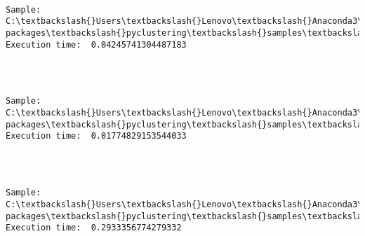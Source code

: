 \documentclass[11pt]{article}
\begin{document}
    \begin{center}
    \end{center}
    { \hspace*{\fill} \\}
    
    \begin{Verbatim}[commandchars=\\\{\}]
Sample:  C:\textbackslash{}Users\textbackslash{}Lenovo\textbackslash{}Anaconda3\textbackslash{}lib\textbackslash{}site-packages\textbackslash{}pyclustering\textbackslash{}samples\textbackslash{}samples\textbackslash{}fcps\textbackslash{}Tetra.data 		Execution time:  0.04245741304487183 


    \end{Verbatim}

    \begin{center}
    \end{center}
    { \hspace*{\fill} \\}
    
    \begin{Verbatim}[commandchars=\\\{\}]
Sample:  C:\textbackslash{}Users\textbackslash{}Lenovo\textbackslash{}Anaconda3\textbackslash{}lib\textbackslash{}site-packages\textbackslash{}pyclustering\textbackslash{}samples\textbackslash{}samples\textbackslash{}fcps\textbackslash{}Hepta.data 		Execution time:  0.01774829153544033 


    \end{Verbatim}

    \begin{center}
    \end{center}
    { \hspace*{\fill} \\}
    
    \begin{Verbatim}[commandchars=\\\{\}]
Sample:  C:\textbackslash{}Users\textbackslash{}Lenovo\textbackslash{}Anaconda3\textbackslash{}lib\textbackslash{}site-packages\textbackslash{}pyclustering\textbackslash{}samples\textbackslash{}samples\textbackslash{}fcps\textbackslash{}Atom.data 		Execution time:  0.2933356774279332 


    \end{Verbatim}

    \begin{center}
    \end{center}
    { \hspace*{\fill} \\}
    

    
    
    
    
\end{document}
